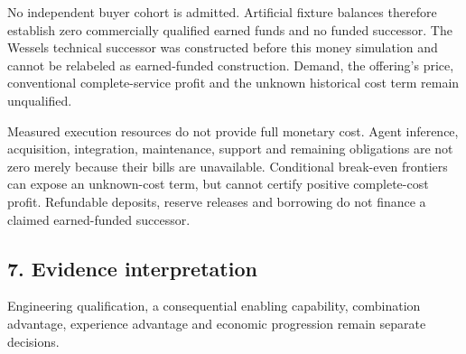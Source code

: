 \documentclass[
  10pt,
]{article}
\begin{document}
No independent buyer cohort is admitted. Artificial fixture balances
therefore establish zero commercially qualified earned funds and no
funded successor. The Wessels technical successor was constructed before
this money simulation and cannot be relabeled as earned-funded
construction. Demand, the offering's price, conventional
complete-service profit and the unknown historical cost term remain
unqualified.

Measured execution resources do not provide full monetary cost. Agent
inference, acquisition, integration, maintenance, support and remaining
obligations are not zero merely because their bills are unavailable.
Conditional break-even frontiers can expose an unknown-cost term, but
cannot certify positive complete-cost profit. Refundable deposits,
reserve releases and borrowing do not finance a claimed earned-funded
successor.

\hypertarget{evidence-interpretation}{%
\subsection{7. Evidence interpretation}\label{evidence-interpretation}}

Engineering qualification, a consequential enabling capability,
combination advantage, experience advantage and economic progression
remain separate decisions.
\end{document}
